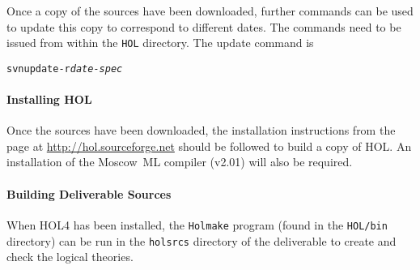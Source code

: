 \documentclass[11pt]{article}
\begin{document}
Once a copy of the sources have been downloaded, further commands can
be used to update this copy to correspond to different dates.  The
commands need to be issued from within the \texttt{HOL} directory.
The update command is
\begin{alltt}
   svn update -r \textit{date-spec}
\end{alltt}

\paragraph{Installing HOL} Once the sources have been downloaded, the
installation instructions from the page at
\url{http://hol.sourceforge.net} should be followed to build a copy of
HOL.  An installation of the Moscow~ML compiler (v2.01) will also be
required.

\paragraph{Building Deliverable Sources}
When HOL4 has been installed, the \texttt{Holmake} program (found in
the \texttt{HOL/bin} directory) can be run in the \texttt{holsrcs}
directory of the \cpp{} deliverable to create and check the logical
theories.

\newpage
\label{sec:bibliography}
\nocite{Stroustrup1994:DECPP,Stroustrup2000:TCPL,Paulson:ML,Gordon93}



\printindex
\end{document}
